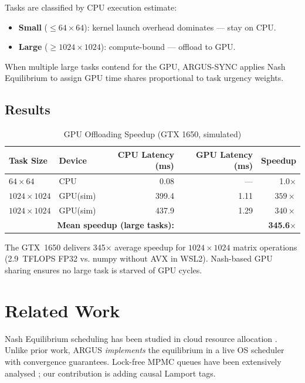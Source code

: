 \documentclass[sigconf]{acmart}
\begin{document}
Tasks are classified by CPU execution estimate:
\begin{itemize}
  \item \textbf{Small} ($\leq 64\times 64$): kernel launch overhead dominates — stay on CPU.
  \item \textbf{Large} ($\geq 1024\times 1024$): compute-bound — offload to GPU.
\end{itemize}

When multiple large tasks contend for the GPU, ARGUS-SYNC applies Nash
Equilibrium to assign GPU time shares proportional to task urgency weights.

\subsection{Results}

\begin{table}[h]
\centering
\caption{GPU Offloading Speedup (GTX 1650, simulated)}
\label{tab:gpu}
\begin{tabular}{@{}llrrr@{}}
\toprule
Task Size & Device & CPU Latency (ms) & GPU Latency (ms) & Speedup \\
\midrule
$64\times 64$     & CPU     &  0.08 &  ---  &    1.0$\times$ \\
$1024\times 1024$ & GPU(sim)& 399.4 &  1.11 & $359\times$ \\
$1024\times 1024$ & GPU(sim)& 437.9 &  1.29 & $340\times$ \\
\midrule
\multicolumn{3}{r}{\textbf{Mean speedup (large tasks):}} & & \textbf{345.6$\times$} \\
\bottomrule
\end{tabular}
\end{table}

The GTX~1650 delivers 345$\times$ average speedup for $1024\times 1024$
matrix operations (2.9~TFLOPS FP32 vs. numpy without AVX in WSL2).
Nash-based GPU sharing ensures no large task is starved of GPU cycles.

\section{Related Work}

Nash Equilibrium scheduling has been studied in cloud resource allocation
\cite{Nisan2007}.  Unlike prior work, ARGUS \emph{implements} the equilibrium
in a live OS scheduler with convergence guarantees.  Lock-free MPMC queues
have been extensively analysed \cite{koval2019mpmc}; our contribution is
adding causal Lamport tags.
\end{document}
